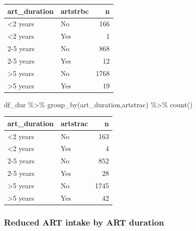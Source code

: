 \documentclass[
  letterpaper,
  DIV=11,
  numbers=noendperiod]{scrartcl}
\newenvironment{Shaded}{\begin{snugshade}}{\end{snugshade}}
\newcommand{\FunctionTok}[1]{\textcolor[rgb]{0.28,0.35,0.67}{#1}}
\newcommand{\NormalTok}[1]{\textcolor[rgb]{0.00,0.23,0.31}{#1}}
\newcommand{\SpecialCharTok}[1]{\textcolor[rgb]{0.37,0.37,0.37}{#1}}
\begin{document}
\begin{longtable}[]{@{}llr@{}}
\toprule\noalign{}
art\_duration & artstrbc & n \\
\midrule\noalign{}
\endhead
\bottomrule\noalign{}
\endlastfoot
\textless2 years & No & 166 \\
\textless2 years & Yes & 1 \\
2-5 years & No & 868 \\
2-5 years & Yes & 12 \\
\textgreater5 years & No & 1768 \\
\textgreater5 years & Yes & 19 \\
\end{longtable}

\begin{Shaded}
\begin{Highlighting}[]
\NormalTok{df\_dur }\SpecialCharTok{\%\textgreater{}\%} \FunctionTok{group\_by}\NormalTok{(art\_duration,artstrac) }\SpecialCharTok{\%\textgreater{}\%} 
  \FunctionTok{count}\NormalTok{()}
\end{Highlighting}
\end{Shaded}

\begin{longtable}[]{@{}llr@{}}
\toprule\noalign{}
art\_duration & artstrac & n \\
\midrule\noalign{}
\endhead
\bottomrule\noalign{}
\endlastfoot
\textless2 years & No & 163 \\
\textless2 years & Yes & 4 \\
2-5 years & No & 852 \\
2-5 years & Yes & 28 \\
\textgreater5 years & No & 1745 \\
\textgreater5 years & Yes & 42 \\
\end{longtable}

\subsubsection{Reduced ART intake by ART
duration}\label{reduced-art-intake-by-art-duration}
\end{document}
